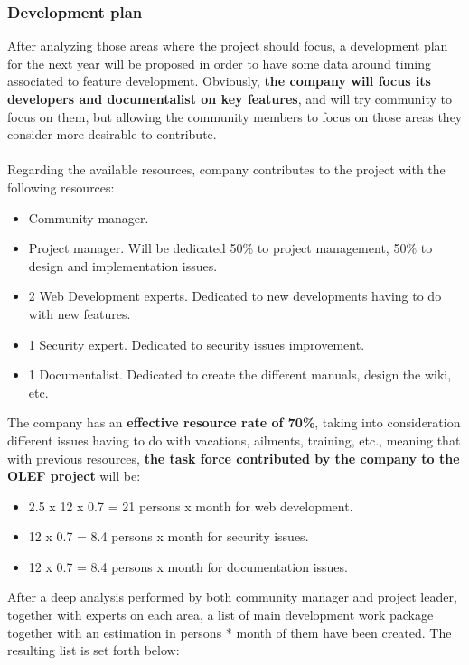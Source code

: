 \documentclass[11pt]{article}
\begin{document}
\subsubsection{Development plan}
After analyzing those areas where the project should focus, a development plan for the next year will be proposed in order to have some data around timing associated to feature development. Obviously, \textbf{the company will focus its developers and documentalist on key features}, and will try community to focus on them, but allowing the community members to focus on those areas they consider more desirable to contribute.\\
\\
Regarding the available resources, company contributes to the project with the following resources:
\begin{itemize}\itemsep0pt
\item{Community manager}. 
\item{Project manager}. Will be dedicated 50\% to project management, 50\% to design and implementation issues.
\item{2 Web Development experts}. Dedicated to new developments having to do with new features.
\item{1 Security expert}. Dedicated to security issues improvement.
\item{1 Documentalist}. Dedicated to create the different manuals, design the wiki, etc.
\end{itemize}
The company has an \textbf{effective resource rate of 70\%}, taking into consideration different issues having to do with vacations, ailments, training, etc., meaning that with previous resources, \textbf{the task force contributed by the company to the OLEF project} will be:
\begin{itemize}\itemsep0pt
\item{2.5 x 12 x 0.7 = 21 persons x month for web development.}
\item{12 x 0.7 = 8.4 persons x month for security issues.}
\item{12 x 0.7 = 8.4 persons x month for documentation issues.}
\end{itemize}
After a deep analysis performed by both community manager and project leader, together with experts on each area, a list of main development work package together with an estimation in persons * month of them have been created. The resulting list is set forth below:
\end{document}
